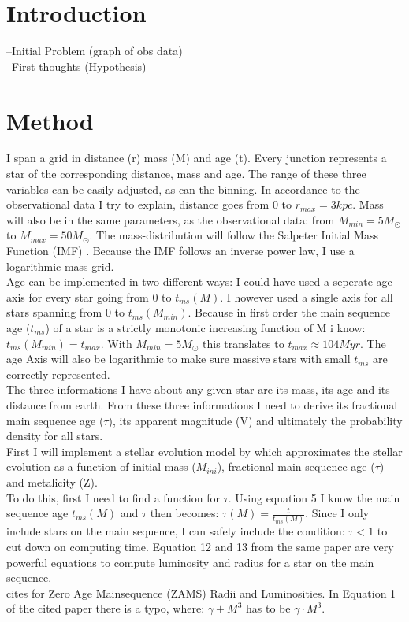 \documentclass[a4paper,10pt]{article}
\date{03/15/15}
\begin{document}
 \section{Introduction}
 --Initial Problem (graph of obs data)\\
 --First thoughts (Hypothesis)\\
 \section{Method}
 
 I span a grid in distance (r) mass (M) and age (t). Every junction represents a star of the corresponding distance, mass and age. The range 
 of these three variables can be easily adjusted, as can the binning. In accordance to the observational data I try to explain, distance goes 
 from 0 to $r_{max}=3kpc$. Mass will also be in the same parameters, as the observational data:
 from $M_{min}=5M_\odot$ to $M_{max}=50M_\odot$. The mass-distribution will follow the Salpeter Initial Mass Function (IMF)
 \citep[see][]{1955ApJ...121..161S}. Because the IMF follows an inverse power law, I use a logarithmic mass-grid.\\ 
 Age can be implemented in two different ways: I could have used a seperate age-axis for every star going from 0 to $t_{ms}(M)$. 
 I however used a single axis for all stars spanning from 0 to $t_{ms}(M_{min})$. Because in first order the main sequence age ($t_{ms}$) of 
 a star is a strictly monotonic increasing function of M i know: $t_{ms}(M_{min})=t_{max}$. With $M_{min}=5M_\odot$ this 
 translates to $t_{max}\approx 104Myr$. The age Axis will also be logarithmic to make sure massive stars with small $t_{ms}$ are correctly
 represented. \\ 
 The three informations I have about any given star are its mass, its age and its distance from earth. From these three informations
 I need to derive its fractional main sequence age ($\tau$), its apparent magnitude (V) and ultimately the probability density
 for all stars.\\  
 First I will implement a stellar evolution model by \citet*{2000MNRAS.315..543H} which approximates the stellar evolution as a 
 function of initial mass ($M_{ini}$), fractional main sequence age ($\tau$) and metalicity (Z). \\ 
 To do this, first I need to find a function for $\tau$. Using equation 5 \citep{2000MNRAS.315..543H} I know the main sequence age 
 $t_{ms}(M)$ and $\tau$ then becomes: $\tau(M)=\frac{t}{t_{ms}(M)}$. Since I only include stars on the main sequence, I can safely include
 the condition: $\tau<1$ to cut down on computing time.
 Equation 12 and 13 from the same paper are very powerful equations to compute luminosity and radius for a star on the main sequence.\\
 \citet{2000MNRAS.315..543H} cites \citet*{1996MNRAS.281..257T} for Zero Age Mainsequence (ZAMS) Radii and Luminosities. 
 In Equation 1 of the cited paper there is a typo, where: $\gamma + M^3$ has to be $\gamma \cdot M^3$.\\
 
\end{document}
